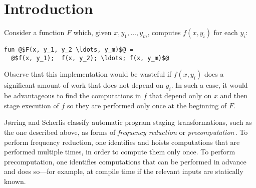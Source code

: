 
\section{Introduction}
\label{sec:intro}


Consider a function $F$ which, given $x, y_1,\dots,y_m$, computes
$f(x,y_i)$ for each $y_i$:
\begin{lstlisting}
fun @$F(x, y_1, y_2 \ldots, y_m)$@ = 
  @$f(x, y_1);  f(x, y_2); \ldots; f(x, y_m)$@
\end{lstlisting}
%
Observe that this implementation would be wasteful if $f(x,y_i)$ does a significant 
amount of work that does not depend on $y_i$.
In such a case, it would be advantageous to find the computations in
$f$ that depend only on $x$ and then stage execution of $f$ so they are
performed only once at the beginning of $F$.



J{\o}rring and Scherlis classify automatic program staging
transformations, such as the one described above, as forms of {\em
  frequency reduction} or {\em
  precomputation}\,\cite{JS86-staging}. To perform frequency
reduction, one identifies and hoists computations that are performed
multiple times, in order to compute them only once. To perform
precomputation, one identifies computations that can be performed in
advance and does so---for example, at compile time if the relevant
inputs are statically known.

